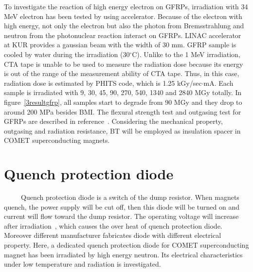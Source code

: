 To investigate the reaction of high energy electron on GFRPs, irradiation with 34 MeV electron has been tested by using accelerator.
Because of the electron with high energy, not only the electron but also the photon from Bremsstrahlung and neutron from the photonuclear reaction interact on GFRPs.
LINAC accelerator at KUR provides a gaussian beam with the width of 30 mm.
GFRP sample is cooled by water during the irradiation (30$^{\circ}$C).
Unlike to the 1 MeV irradiation, CTA tape is unable to be used to measure the radiation dose because its energy is out of the range of the measurement ability of CTA tape.
Thus, in this case, radiation dose is estimated by PHITS code, which is 1.25 kGy/sec$\cdot$mA.
Each sample is irradiated with 9, 30, 45, 90, 270, 540, 1340 and 2840 MGy totally.
In figure~\ref{3resultgfrp}, all samples start to degrade from 90 MGy and they drop to around 200 MPa besides BMI.
The flexural strength test and outgasing test for GFRPs are described in reference~\cite{takasaki}.
Considering the mechanical property, outgasing and radiation resistance, BT will be employed as insulation spacer in COMET superconducting magnets.

 \section{Quench protection diode}
~~~~~Quench protection diode is a switch of the dump resistor.
When magnets quench, the power supply will be cut off, then this diode will be turned on and current will flow toward the dump resistor.
The operating voltage will increase after irradiation~\cite{hagedorn}, which causes the over heat of quench protection diode.
Moreover different manufacturer fabricates diode with different electrical property.
Here, a dedicated quench protection diode for COMET superconducting magnet has been irradiated by high energy neutron.
Its electrical characteristics under low temperature and radiation is investigated.

